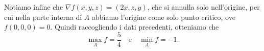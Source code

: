 \begin{enumerate}
		Notiamo infine che $\nabla f(x,y,z) = (2x, z, y)$, che si annulla solo nell'origine, per cui nella parte interna di $A$ abbiamo l'origine come solo punto critico, ove $f(0,0,0) = 0$. Quindi raccogliendo i dati precedenti, otteniamo che
		\[
		\max_A f = \frac{5}{4} \quad \text{e} \quad \min_A f = -1.
		\]
	
\end{enumerate}